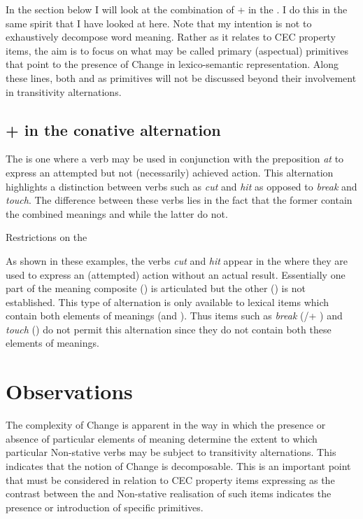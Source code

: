 In the section below I will look at the combination of \MOTION +
\CONTACT in the .  I do this in the same spirit
that I have looked at \CONTACT here.  Note that my intention is not to
exhaustively decompose word meaning.  Rather as it relates to CEC
property items, the aim is to focus on what may be called primary
(aspectual) primitives that point to the presence of Change in
lexico-semantic representation.  Along these lines, both \CONTACT and
\MOTION as primitives will not be discussed beyond their involvement in
transitivity alternations.

\subsection{\MOTION + \CONTACT in the conative alternation}\label{sec:4.4.3}
The  is one where a verb may be used in
conjunction with the preposition \textit{at} to express an attempted but not
(necessarily) achieved action.  This alternation highlights a
distinction between verbs such as \textit{cut} and \textit{hit} as opposed to
\textit{break} and \textit{touch}.  The difference between these verbs lies in the
fact that the former contain the combined meanings \MOTION and \CONTACT
while the latter do not.

\ea\label{ex:4:18} Restrictions on the  \citep[6, example 14]{Levin1993}
\z \z

As shown in these examples, the verbs \textit{cut} and \textit{hit} appear in the
 where they are used to express an (attempted)
action without an actual result.  Essentially one part of the meaning
composite (\MOTION) is articulated but the other (\CONTACT) is not
established.  This type of alternation is only available to lexical
items which contain both elements of meanings (\MOTION and
\CONTACT). Thus items such as \textit{break} (\BECOME\slash\CAUSE + \BECOME) and
\textit{touch} (\CONTACT) do not permit this alternation since they do not
contain both these elements of meanings.

\section{Observations}\label{sec:4.5}

The complexity of Change is apparent in the way in which the presence
or absence of particular elements of meaning determine the extent to
which particular Non-stative verbs may be subject to transitivity
alternations.  This indicates that the notion of Change is
decomposable.  This is an important point that must be considered in
relation to CEC property items expressing  as
the contrast between the  and Non-stative realisation of such
items indicates the presence or introduction of specific primitives.

